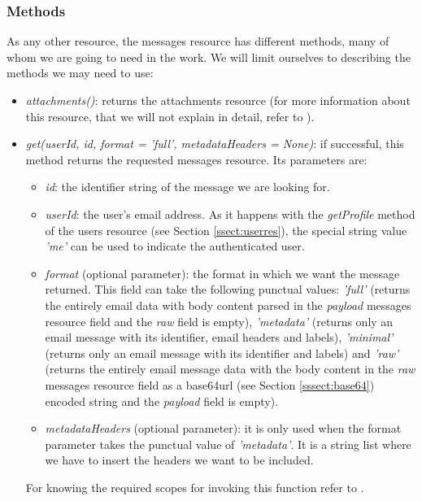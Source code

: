 \subsubsection{Methods}\label{sssect:msgmethods}
As any other resource, the messages resource has different methods, many of whom we are going to need in the work. We will limit ourselves to describing the methods we may need to use:

\begin{itemize}
	\item\textit{attachments()}: returns the attachments resource (for more information about this resource, that we will not explain in detail, refer to \cite[/v1/reference/users/messages/attachments]{gmailAPI}).
	\item\textit{get(userId, id, format = 'full', metadataHeaders = None)}: if successful, this method returns the requested messages resource. Its parameters are:
	\begin{itemize}
		\item\textit{id}: the identifier string of the message we are looking for.
		\item\textit{userId}: the user's email address. As it happens with the \textit{getProfile} method of the users resource (see Section \ref{ssect:userres}), the special string value \textit{'me'} can be used to indicate the authenticated user.
		\item\textit{format} (optional parameter): the format in which we want the message returned. This field can take the following punctual values: \textit{'full'} (returns the entirely email data with body content parsed in the \textit{payload} messages resource field and the \textit{raw} field is empty), \textit{'metadata'} (returns only an email message with its identifier, email headers and labels), \textit{'minimal'} (returns only an email message with its identifier and labels) and \textit{'raw'} (returns the entirely email message data with the body content in the \textit{raw} messages resource field as a base64url (see Section \ref{sssect:base64}) encoded string and the \textit{payload} field is empty).
		\item\textit{metadataHeaders} (optional parameter): it is only used when the format parameter takes the punctual value of \textit{'metadata'}. It is a string list where we have to insert the headers we want to be included.
	\end{itemize}
	For knowing the required scopes for invoking this function refer to \cite[/v1/reference/users/messages/get]{gmailAPI}.

\end{itemize}
